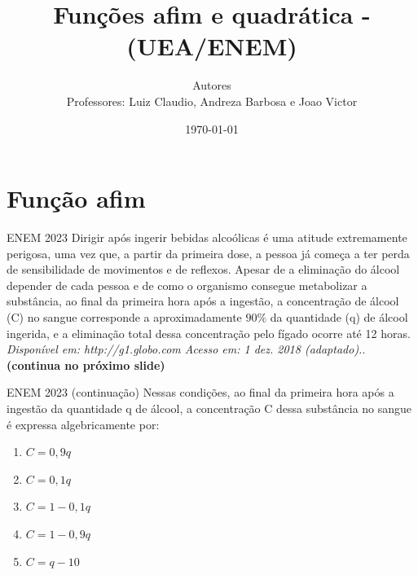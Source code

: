 \documentclass[11pt]{beamer}
\author[CETi / IFAM CMC]{Autores \\ Professores: Luiz Claudio, Andreza Barbosa e Joao Victor}
\title{Funções afim e quadrática - (UEA/ENEM)}
\institute[]{CETi BILÍNGUE GILBERTO MESTRINHO \par INSTITUTO FEDERAL DO AMAZONAS }
\date{\today}
\begin{document}
\justifying
\onehalfspacing 

\begin{frame}
    \titlepage
\end{frame}

\section{Função afim}

\begin{frame}{ENEM 2023}
    Dirigir após ingerir bebidas alcoólicas é uma atitude extremamente perigosa, uma vez que, a partir da primeira dose, a pessoa já começa a ter perda de sensibilidade de movimentos e de reflexos. Apesar de a eliminação do álcool depender de cada pessoa e de como o organismo consegue metabolizar a substância, ao final da primeira hora após a ingestão, a concentração de álcool (C) no sangue corresponde a aproximadamente $90\%$ da quantidade (q) de álcool ingerida, e a eliminação total dessa concentração pelo fígado ocorre até 12 horas. \textit{Disponível em: http://g1.globo.com Acesso em: 1 dez. 2018 (adaptado).}. \vfill
    \textbf{(continua no próximo slide)}
\end{frame}

\begin{frame}{ENEM 2023 (continuação)}
    Nessas condições, ao final da primeira hora após a ingestão da quantidade q de álcool, a concentração C dessa substância no sangue é expressa algebricamente por:

    \begin{enumerate}[a]
                \item $C = 0,9q$ %
                \item $C = 0,1q$
                \item $C = 1 - 0,1q$
                \item $C = 1 - 0,9q$ 
                \item $C = q - 10$
            \end{enumerate}
\end{frame}
\end{document}
